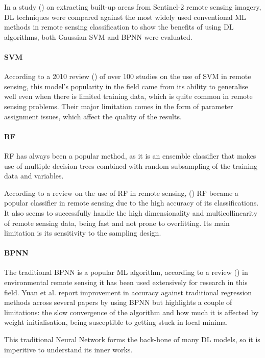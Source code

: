 In a study (\cite{isprs-archives-XLII-3-79-2018}) on extracting built-up areas from Sentinel-2 remote sensing imagery, \gls{DL} techniques were compared against the most widely used conventional \gls{ML} methods in remote sensing classification to show the benefits of using \gls{DL} algorithms, both Gaussian \gls{SVM} and \gls{BPNN} were evaluated.

\paragraph{\gls{SVM}}
According to a 2010 review (\cite{MOUNTRAKIS2011247}) of over 100 studies on the use of \gls{SVM} in remote sensing, this model's popularity in the field came from its ability to generalise well even when there is limited training data, which is quite common in remote sensing problems. Their major limitation comes in the form of parameter assignment issues, which affect the quality of the results.

\paragraph{\gls{RF}}
\gls{RF} has always been a popular method, as it is an ensemble classifier that makes use of multiple decision trees combined with random subsampling of the training data and variables. 

According to a review on the use of \gls{RF} in remote sensing, (\cite{BELGIU201624}) \gls{RF} became a popular classifier in remote sensing due to the high accuracy of its classifications. It also seems to successfully handle the high dimensionality and multicollinearity of remote sensing data, being fast and not prone to overfitting. Its main limitation is its sensitivity to the sampling design.

\paragraph{\gls{BPNN}}
The traditional \gls{BPNN} is a popular \gls{ML} algorithm, according to a review (\cite{YUAN2020111716}) in environmental remote sensing it has been used extensively for research in this field. Yuan et al. report improvement in accuracy against traditional regression methods across several papers by using \gls{BPNN} but highlights a couple of limitations: the slow convergence of the algorithm and how much it is affected by weight initialisation, being susceptible to getting stuck in local minima. 

This traditional Neural Network forms the back-bone of many \gls{DL} models, so it is imperitive to understand its inner works.

